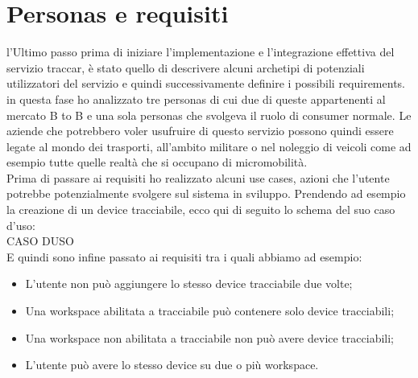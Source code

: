 \documentclass[a4paper,titlepage,12pt]{book}
\begin{document}
\section{
\sffamily Personas e requisiti}
l'Ultimo passo prima di iniziare l'implementazione e l'integrazione effettiva del servizio traccar, è stato quello di descrivere alcuni archetipi di potenziali utilizzatori del servizio e quindi successivamente definire i possibili requirements.\\
in questa fase ho analizzato tre personas di cui due di queste appartenenti al mercato B to B e una sola personas che svolgeva il ruolo di consumer normale. Le aziende che potrebbero voler usufruire di questo servizio possono quindi essere legate al mondo dei trasporti, all'ambito militare o nel noleggio di veicoli come ad esempio tutte quelle realtà che si occupano di micromobilità.\\
Prima di passare ai requisiti ho realizzato alcuni use cases, azioni che l'utente potrebbe potenzialmente svolgere sul sistema in sviluppo. Prendendo ad esempio la creazione di un device tracciabile, ecco qui di seguito lo schema del suo caso d'uso:\\
CASO DUSO\\
E quindi sono infine passato ai requisiti tra i quali abbiamo ad esempio:
\begin{itemize}
\item L'utente non può aggiungere lo stesso device tracciabile due volte;
\item Una workspace abilitata a tracciabile può contenere solo device tracciabili;
\item Una workspace non abilitata a tracciabile non può avere device tracciabili;
\item L'utente può avere lo stesso device su due o più workspace.\\
\end{itemize}

\sffamily
\end{document}
